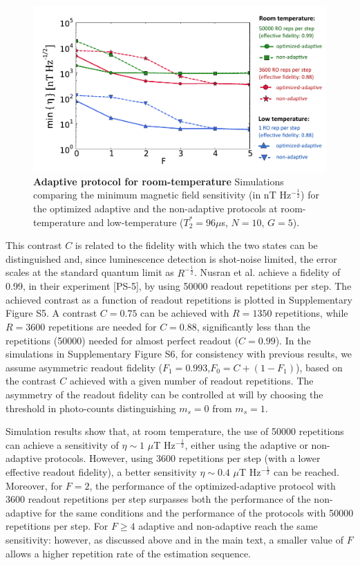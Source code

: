 \documentclass{report}
\begin{document}
\begin{figure}[h]
	\centering
	\includegraphics[width=12cm]{figures/fig_S6}
	\caption{\label{fig:ammS6} \textbf{Adaptive protocol for room-temperature} Simulations comparing the minimum magnetic field sensitivity (in nT Hz$^{-\frac{1}{2}}$) for the optimized adaptive and the non-adaptive protocols at room-temperature and low-temperature ($T_2^* = 96 \mu$s, $N = 10$, $G = 5$). 
	}
\end{figure}
This contrast $C$ is related to the fidelity with which the two states can be distinguished and, since luminescence detection is shot-noise limited, the error scales at the standard quantum limit as $R^{-\frac{1}{2}}$. Nusran et al. achieve a fidelity of 0.99, in their experiment [PS-5], by using 50000 readout repetitions per step. The achieved contrast as a function of readout repetitions is plotted in Supplementary Figure S5.
A contrast $C = 0.75$ can be achieved with $R = 1350$ repetitions, while $R = 3600$ repetitions are needed for $C = 0.88$, significantly less than the repetitions (50000) needed for almost perfect readout ($C = 0.99$). 
In the simulations in Supplementary Figure S6, for consistency with previous results, we assume asymmetric readout fidelity ($F_1 = 0.993$,$F_0 = C+(1-F_1)$), based on the contrast $C$ achieved with a given number of readout repetitions. The asymmetry of the readout fidelity can be controlled at will by choosing the threshold in photo-counts distinguishing $m_s = 0$ from $m_s = 1$.

Simulation results show that, at room temperature, the use of 50000 repetitions can achieve a sensitivity of $\eta \sim 1$ $\mu$T Hz$^{-\frac{1}{2}}$, either using the adaptive or non-adaptive protocols. However, using 3600 repetitions per step (with a lower effective readout fidelity), a better sensitivity $\eta \sim 0.4$ $\mu$T Hz$^{-\frac{1}{2}}$ can be reached. Moreover, for $F = 2$, the performance of the optimized-adaptive protocol with 3600 readout repetitions per step surpasses both the performance of the non-adaptive for the same conditions and the performance of the protocols with 50000 repetitions per step. For $F \geq 4$ adaptive and non-adaptive reach the same sensitivity: however, as discussed above and in the main text, a smaller value of $F$ allows a higher repetition rate of the estimation sequence.
\end{document}
